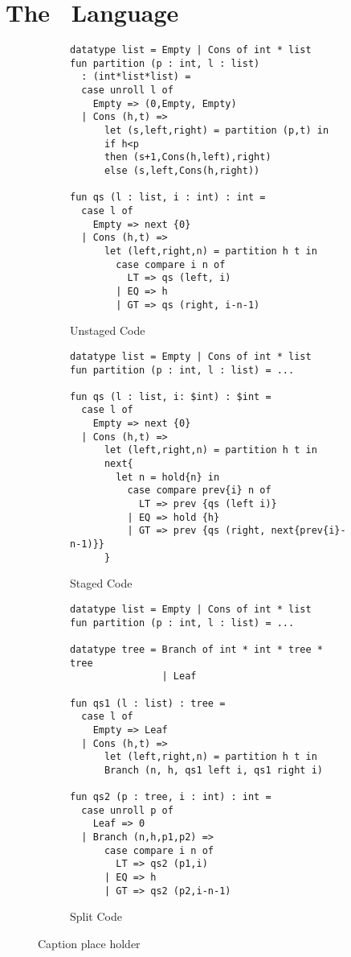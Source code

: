 \section {The \lang\ Language}

\begin{figure*}
\label{fig:quickselect}
\begin{subfigure}{0.5\textwidth}
\begin{lstlisting} 
datatype list = Empty | Cons of int * list
fun partition (p : int, l : list) 
  : (int*list*list) =
  case unroll l of 
    Empty => (0,Empty, Empty) 
  | Cons (h,t) =>
      let (s,left,right) = partition (p,t) in
      if h<p 
      then (s+1,Cons(h,left),right)
      else (s,left,Cons(h,right))

fun qs (l : list, i : int) : int = 
  case l of
    Empty => next {0}
  | Cons (h,t) => 
      let (left,right,n) = partition h t in
        case compare i n of
          LT => qs (left, i)
        | EQ => h
        | GT => qs (right, i-n-1)
\end{lstlisting}
\caption{Unstaged Code}
\end{subfigure}
\begin{subfigure}{0.5\textwidth}
\begin{lstlisting} 
datatype list = Empty | Cons of int * list
fun partition (p : int, l : list) = ...

fun qs (l : list, i: $int) : $int = 
  case l of
    Empty => next {0}
  | Cons (h,t) => 
      let (left,right,n) = partition h t in
      next{
        let n = hold{n} in
          case compare prev{i} n of
            LT => prev {qs (left i)}
          | EQ => hold {h}
          | GT => prev {qs (right, next{prev{i}-n-1)}}
      }	
\end{lstlisting}
\caption{Staged Code}
\end{subfigure}
\begin{subfigure}{0.5\textwidth}
\begin{lstlisting} 
datatype list = Empty | Cons of int * list
fun partition (p : int, l : list) = ...
	
datatype tree = Branch of int * int * tree * tree
                | Leaf

fun qs1 (l : list) : tree =
  case l of
    Empty => Leaf
  | Cons (h,t) => 
      let (left,right,n) = partition h t in
      Branch (n, h, qs1 left i, qs1 right i)

fun qs2 (p : tree, i : int) : int = 
  case unroll p of
    Leaf => 0
  | Branch (n,h,p1,p2) => 
      case compare i n of
        LT => qs2 (p1,i)
      | EQ => h
      | GT => qs2 (p2,i-n-1)
\end{lstlisting}
\caption{Split Code}
\end{subfigure}
\caption{Caption place holder}
\end{figure*}

